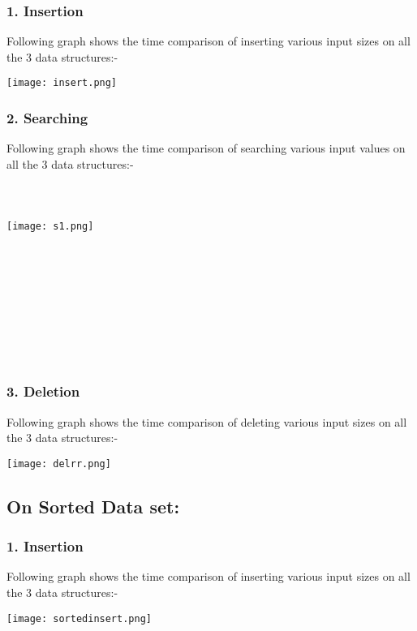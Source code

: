 \documentclass[10pt,a4paper]{article} ,
\begin{document}
\subsubsection*{1. Insertion}

Following graph shows the time comparison of inserting various input sizes on all the 3 data structures:-
	

\texttt{[image: insert.png]} 


\subsubsection*{2. Searching}

Following graph shows the time comparison of searching various input values on all the 3 data structures:-\\ \\ \\ \\ 


\texttt{[image: s1.png]}  \\ 


\subsubsection*{\\ \\ \\ \\ \\ \\ \\ 3. Deletion}

Following graph shows the time comparison of deleting various input sizes on all the 3 data structures:-


\texttt{[image: delrr.png]} 



\subsection*{On Sorted Data set:}

\subsubsection*{1. Insertion}

Following graph shows the time comparison of inserting various input sizes on all the 3 data structures:-
 

\texttt{[image: sortedinsert.png]}  
\end{document}
